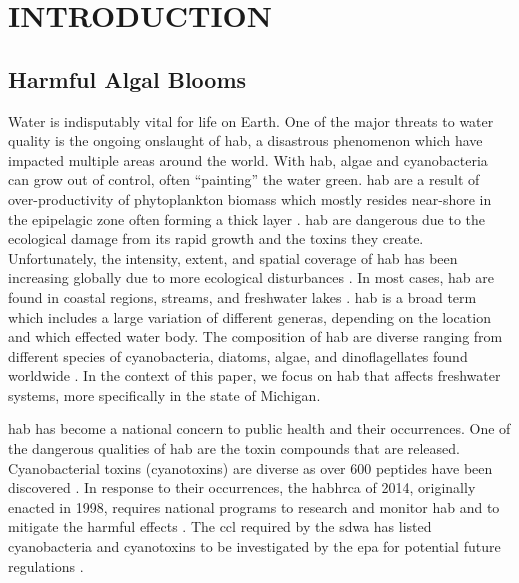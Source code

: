 
\chapter{INTRODUCTION}
\section{Harmful Algal Blooms}

Water is indisputably vital for life on Earth. One of the major threats to water quality is the ongoing onslaught of \gls{hab}, a disastrous phenomenon which have impacted multiple areas around the world. With \gls{hab}, algae and cyanobacteria can grow out of control, often ``painting'' the water green. \gls{hab} are a result of over-productivity of phytoplankton biomass which mostly resides near-shore in the epipelagic zone often forming a thick layer \cite{moore_richard_cyanobacterial_1993}.  \gls{hab} are dangerous due to the ecological damage from its rapid growth and the toxins they create. Unfortunately, the intensity, extent, and spatial coverage of \gls{hab} has been increasing globally due to more ecological disturbances \cite{codd_cyanobacterial_1999}. In most cases, \gls{hab} are found in coastal regions, streams, and freshwater lakes \cite{rastogi_cyanotoxin-microcystins:_2014}. \gls{hab} is a broad term which includes a large variation of different generas, depending on the location and which effected water body. The composition of \gls{hab} are diverse ranging from  different species of cyanobacteria, diatoms, algae, and dinoflagellates found worldwide \cite{dittmann_cyanobacterial_2012}. In the context of this paper, we focus on \gls{hab} that affects freshwater systems, more specifically in the state of Michigan.

\gls{hab} has become a national concern to public health and their occurrences. One of the dangerous qualities of \gls{hab} are the toxin compounds that are released. Cyanobacterial toxins (cyanotoxins) are diverse as over 600 peptides have been discovered \cite{welker_cyanobacterial_2006}. In response to their occurrences, the \gls{habhrca} of 2014, originally enacted in 1998, requires national programs to research and monitor \gls{hab} and to mitigate the harmful effects \cite{noauthor_harmful_2014}. The \gls{ccl} required by the \gls{sdwa} has listed cyanobacteria and cyanotoxins to be investigated by the \gls{epa} for potential future regulations \cite{usepa_drinking_2016}. 

